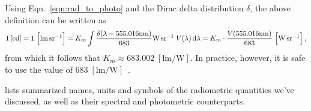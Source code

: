 \ifomit


Using Eqn.~\eqref{eqn:rad_to_photo} and the Dirac delta distribution $\delta$, the
above definition can be written as
\begin{displaymath}
    1\,[\unit{\candela}] = 1\,\left[\unit{\lumen\per\steradian}\right]
    = K_m \int \frac{\delta(\lambda-555.016\unit{\nano\meter})}{683} \unit{\watt\per\steradian}\;V(\lambda) \d\lambda
    = K_m \cdot \frac{V(555.016\unit{\nano\meter})}{683}\,\left[\unit{\watt\per\steradian}\right],
\end{displaymath}
from which it follows that $K_{m} \approx 683.002 \;[\unit{\lumen\per\watt}]$. 
In practice, however, it is safe to use the value of 
$683\;[\unit{\lumen\per\watt}]$~\cite{cie:018.2019,wyszecki2000}.
\fi


 lists summarized names, units and symbols of the radiometric quantities we've discussed,
as well as their spectral and photometric counterparts.

